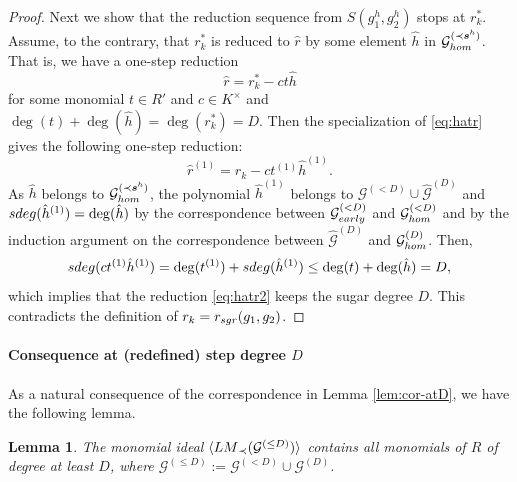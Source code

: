 \documentclass{article}
\newtheorem{lemma}[theorem]{Lemma}
\theoremstyle{definition}
\theoremstyle{plain}
\theoremstyle{plain}
\theoremstyle{plain}
\theoremstyle{plain}
\numberwithin{equation}{subsection}
\begin{document}
\begin{proof}
Next we show that the reduction sequence from $S(g_1^h,g_2^h)$ stops at $r^*_k$. 
Assume, to the contrary, that $r^*_k$ is reduced to $\hat{r}$ by some element $\hat{h}$ in $\mathcal{G}_{\rm hom}^{(\prec\bm{s}^h)}$.
That is, we have a one-step reduction
\begin{equation}\label{eq:hatr}
\hat{r}=r^*_k-ct\hat{h}
\end{equation}
for some monomial $t\in R'$ and $c\in K^\times$ and $\deg(t)+\deg(\hat{h})= \deg(r^*_k)=D$. 
Then the specialization of \eqref{eq:hatr} gives the following one-step reduction:
\begin{equation}\label{eq:hatr2}
\hat{r}^{(1)}=r_k-ct^{(1)}\hat{h}^{(1)}.
\end{equation}
As $\hat{h}$ belongs to $\mathcal{G}_{\rm hom}^{(\prec \bm{s}^h)}$, the polynomial $\hat{h}^{(1)}$ belongs to $\mathcal{G}^{(<D)}\cup \widehat{\mathcal{G}}^{(D)}$ and ${\rm sdeg}(\hat{h}^{(1)})=\deg(\hat{h})$ by the correspondence between $\mathcal{G}_{\rm early}^{(<D)}$ and $\mathcal{G}_{\rm hom}^{(<D)}$ and by the induction argument on the correspondence between $\widehat{\mathcal{G}}^{(D)}$ and $\mathcal{G}_{\rm hom}^{(D)}$.
Then, 
\[
{\rm sdeg}(ct^{(1)}\hat{h}^{(1)})= \deg(t^{(1)})+{\rm sdeg}(\hat{h}^{(1)})\leq \deg(t)+\deg(\hat{h}) 
= D,
\]
which implies that the reduction \eqref{eq:hatr2} keeps the sugar degree $D$. 
This contradicts the definition of $r_k=r_{\rm sgr}(g_1,g_2)$. 
\end{proof}

\paragraph{Consequence at (redefined) step degree $D$}
As a natural consequence of the correspondence in Lemma \ref{lem:cor-atD}, we have the following lemma. 

\begin{lemma}\label{lem:atD}
The monomial ideal $\langle {\rm LM}_{\prec}(\mathcal{G}^{(\leq D)})\rangle$ contains all monomials of $R$ of degree at least $D$, where $\mathcal{G}^{(\leq D)}:=\mathcal{G}^{(<D)}\cup \mathcal{G}^{(D)}$.
\end{lemma}
\end{document}
